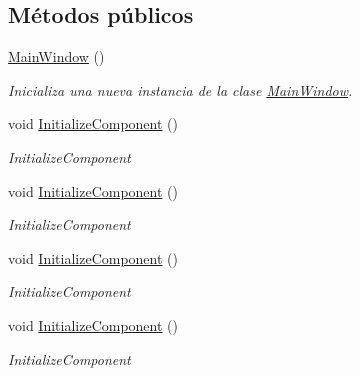 \subsection*{Métodos públicos}
\begin{DoxyCompactItemize}
\item 
\hyperlink{class_proyecto___integrador__3_1_1_main_window_a0563d3e86c5dbee1b06074cb99b557a6}{Main\-Window} ()
\begin{DoxyCompactList}\small\item\em Inicializa una nueva instancia de la clase \hyperlink{class_proyecto___integrador__3_1_1_main_window}{Main\-Window}. \end{DoxyCompactList}\item 
void \hyperlink{class_proyecto___integrador__3_1_1_main_window_ab7151625146f0c268d8404f4ab8869bc}{Initialize\-Component} ()
\begin{DoxyCompactList}\small\item\em Initialize\-Component \end{DoxyCompactList}\item 
void \hyperlink{class_proyecto___integrador__3_1_1_main_window_ab7151625146f0c268d8404f4ab8869bc}{Initialize\-Component} ()
\begin{DoxyCompactList}\small\item\em Initialize\-Component \end{DoxyCompactList}\item 
void \hyperlink{class_proyecto___integrador__3_1_1_main_window_ab7151625146f0c268d8404f4ab8869bc}{Initialize\-Component} ()
\begin{DoxyCompactList}\small\item\em Initialize\-Component \end{DoxyCompactList}\item 
void \hyperlink{class_proyecto___integrador__3_1_1_main_window_ab7151625146f0c268d8404f4ab8869bc}{Initialize\-Component} ()
\begin{DoxyCompactList}\small\item\em Initialize\-Component \end{DoxyCompactList}\end{DoxyCompactItemize}

